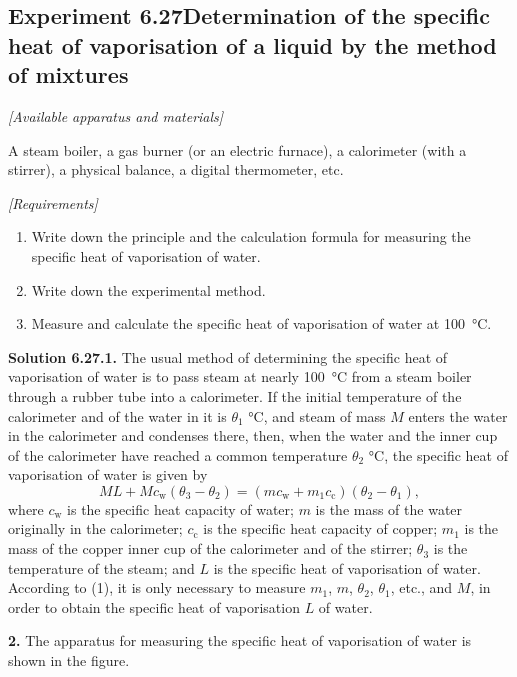 \subsection*{Experiment 6.27\quad Determination of the specific heat of vaporisation of a liquid by the method of mixtures}

\noindent\textit{[Available apparatus and materials]}

A steam boiler, a gas burner (or an electric furnace), a calorimeter (with a stirrer), a physical balance, a digital thermometer, etc.

\noindent\textit{[Requirements]}
\begin{enumerate}[label=(\arabic*),leftmargin=2.2em,itemsep=1pt,topsep=2pt]
\item Write down the principle and the calculation formula for measuring the specific heat of vaporisation of water.
\item Write down the experimental method.
\item Measure and calculate the specific heat of vaporisation of water at \SI{100}{\celsius}.
\end{enumerate}

\medskip
\noindent\textbf{Solution 6.27.}\quad \textbf{1.} The usual method of determining the specific heat of vaporisation of water is to pass steam at nearly \SI{100}{\celsius} from a steam boiler through a rubber tube into a calorimeter. If the initial temperature of the calorimeter and of the water in it is $\theta_1$ \si{\celsius}, and steam of mass $M$ enters the water in the calorimeter and condenses there, then, when the water and the inner cup of the calorimeter have reached a common temperature $\theta_2$ \si{\celsius}, the specific heat of vaporisation of water is given by
\begin{equation}\tag{1}
ML+Mc_{\mathrm{w}}(\theta_3-\theta_2)=(mc_{\mathrm{w}}+m_1c_{\mathrm{c}})(\theta_2-\theta_1),
\end{equation}
where $c_{\mathrm{w}}$ is the specific heat capacity of water; $m$ is the mass of the water originally in the calorimeter; $c_{\mathrm{c}}$ is the specific heat capacity of copper; $m_1$ is the mass of the copper inner cup of the calorimeter and of the stirrer; $\theta_3$ is the temperature of the steam; and $L$ is the specific heat of vaporisation of water. According to (1), it is only necessary to measure $m_1$, $m$, $\theta_2$, $\theta_1$, etc., and $M$, in order to obtain the specific heat of vaporisation $L$ of water.

\textbf{2.} The apparatus for measuring the specific heat of vaporisation of water is shown in the figure.

